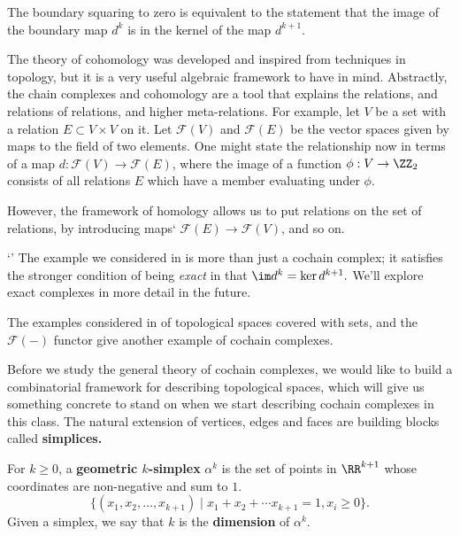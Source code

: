 The boundary squaring to zero is equivalent to the statement that the image of the boundary map $d^{k}$ is in the kernel of the map $d^{k+1}$.

The theory of cohomology was developed and inspired from techniques in topology, but it is a very useful algebraic framework to have in mind. 
Abstractly, the chain complexes and cohomology are a tool that explains the relations, and relations of relations, and higher meta-relations.
For example, let $V$ be a set with a relation $E\subset V\times V$ on it. Let $\mathcal F(V)$ and $\mathcal F(E)$ be the vector spaces given by maps to the field of two elements.
One might state the relationship now in terms of a map $d: \mathcal F(V)\to \mathcal F(E)$, where the image of a function $\phi:V\to \ZZ_2$ consists of all relations $E$ which have a member evaluating under $\phi$. 

However, the framework of homology allows us to put relations on the set of relations, by introducing maps` $\mathcal F(E)\to \mathcal F(V)$, and so on. 
\begin{example}`'
The example we considered in  is more than just a cochain complex; it satisfies the stronger condition of being \emph{exact} in that $\im d^k=\ker d^{k+1}.$ We'll explore exact complexes in more detail in the future. 
\end{example}
\begin{example}
	The examples considered in  of topological spaces covered with sets, and the $\mathcal F(-)$ functor give another example of cochain complexes.
\end{example}
Before we study the general theory of cochain complexes, we would like to build a combinatorial framework for describing topological spaces, which will give us something concrete to stand on when we start describing cochain complexes in this class. 
The natural extension of vertices, edges and faces are building blocks called \textbf{simplices.}
\begin{definition}
	For $k\geq 0$,  a \textbf{geometric $k$-simplex} $\alpha^k$ is the set of points in $\RR^{k+1}$ whose coordinates are non-negative and sum to $1$. 
	\[\{(x_1, x_2, \ldots,  x_{k+1})\;| \; x_1+x_2+\cdots x_{k+1}=1,  x_i\geq 0\}.\]
	Given a simplex,  we say that $k$ is the \textbf{dimension} of $\alpha^k$. 
\end{definition}

